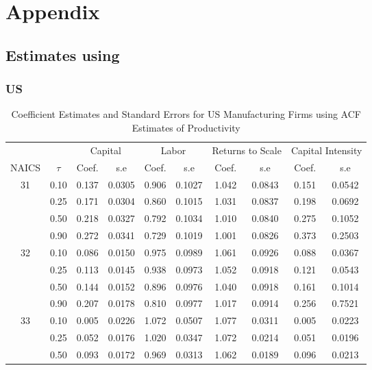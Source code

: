 \documentclass[11pt]{article}
\begin{document}



\section*{Appendix} \label{Appendix}
\subsection{Estimates using \cite{Ackerberg2015}}
\subsubsection{US}
\begin{table}[H]
\centering
\caption{Coefficient Estimates and Standard Errors for US Manufacturing Firms using ACF Estimates of Productivity}
\begin{tabular}{cccccccccc}
  \hline\hline & & \multicolumn{2}{c}{Capital}  & \multicolumn{2}{c}{Labor} & \multicolumn{2}{c}{Returns to Scale} & \multicolumn{2}{c}{Capital Intensity}\\ \cmidrule(lr){3-4} \cmidrule(lr){5-6} \cmidrule(lr){7-8} \cmidrule(lr){9-10}NAICS & $\tau$ & Coef. & s.e & Coef. & s.e & Coef. & s.e & Coef. & s.e \\ 
  \hline
31 & 0.10 & 0.137 & 0.0305 & 0.906 & 0.1027 & 1.042 & 0.0843 & 0.151 & 0.0542 \\ 
   & 0.25 & 0.171 & 0.0304 & 0.860 & 0.1015 & 1.031 & 0.0837 & 0.198 & 0.0692 \\ 
   & 0.50 & 0.218 & 0.0327 & 0.792 & 0.1034 & 1.010 & 0.0840 & 0.275 & 0.1052 \\ 
   & 0.90 & 0.272 & 0.0341 & 0.729 & 0.1019 & 1.001 & 0.0826 & 0.373 & 0.2503 \\ 
  32 & 0.10 & 0.086 & 0.0150 & 0.975 & 0.0989 & 1.061 & 0.0926 & 0.088 & 0.0367 \\ 
   & 0.25 & 0.113 & 0.0145 & 0.938 & 0.0973 & 1.052 & 0.0918 & 0.121 & 0.0543 \\ 
   & 0.50 & 0.144 & 0.0152 & 0.896 & 0.0976 & 1.040 & 0.0918 & 0.161 & 0.1014 \\ 
   & 0.90 & 0.207 & 0.0178 & 0.810 & 0.0977 & 1.017 & 0.0914 & 0.256 & 0.7521 \\ 
  33 & 0.10 & 0.005 & 0.0226 & 1.072 & 0.0507 & 1.077 & 0.0311 & 0.005 & 0.0223 \\ 
   & 0.25 & 0.052 & 0.0176 & 1.020 & 0.0347 & 1.072 & 0.0214 & 0.051 & 0.0196 \\ 
   & 0.50 & 0.093 & 0.0172 & 0.969 & 0.0313 & 1.062 & 0.0189 & 0.096 & 0.0213 \\ 

\end{tabular}
\end{table}
\end{document}
